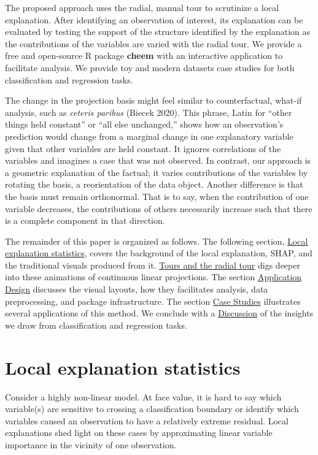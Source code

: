 \documentclass[
  article]{article}
\begin{document}
The proposed approach uses the radial, manual tour to scrutinize a local explanation. After identifying an observation of interest, its explanation can be evaluated by testing the support of the structure identified by the explanation as the contributions of the variables are varied with the radial tour. We provide a free and open-source R package \textbf{cheem} with an interactive application to facilitate analysis. We provide toy and modern datasets case studies for both classification and regression tasks.

The change in the projection basis might feel similar to counterfactual, what-if analysis, such as \emph{ceteris paribus} (Biecek 2020). This phrase, Latin for ``other things held constant'' or ``all else unchanged,'' shows how an observation's prediction would change from a marginal change in one explanatory variable given that other variables are held constant. It ignores correlations of the variables and imagines a case that was not observed. In contrast, our approach is a geometric explanation of the factual; it varies contributions of the variables by rotating the basis, a reorientation of the data object. Another difference is that the basis must remain orthonormal. That is to say, when the contribution of one variable decreases, the contributions of others necessarily increase such that there is a complete component in that direction.

The remainder of this paper is organized as follows. The following section, \protect\hyperlink{sec:explanations}{Local explanation statistics}, covers the background of the local explanation, SHAP, and the traditional visuals produced from it. \protect\hyperlink{sec:tour}{Tours and the radial tour} digs deeper into these animations of continuous linear projections. The section \protect\hyperlink{sec:applicationdesign}{Application Design} discusses the visual layouts, how they facilitates analysis, data preprocessing, and package infrastructure. The section \protect\hyperlink{sec:casestudies}{Case Studies} illustrates several applications of this method. We conclude with a \protect\hyperlink{sec:cheemdiscussion}{Discussion} of the insights we draw from classification and regression tasks.

\hypertarget{sec:explanations}{%
\section{Local explanation statistics}\label{sec:explanations}}

Consider a highly non-linear model. At face value, it is hard to say which variable(s) are sensitive to crossing a classification boundary or identify which variables caused an observation to have a relatively extreme residual. Local explanations shed light on these cases by approximating linear variable importance in the vicinity of one observation.
\end{document}
